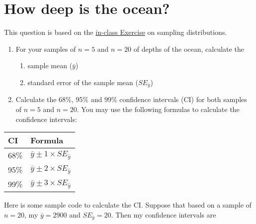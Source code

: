 \documentclass[letterpaper,9pt,twoside,printwatermark=false]{pinp}
\providecommand{\tightlist}{%
  \setlength{\itemsep}{0pt}\setlength{\parskip}{0pt}}
\begin{document}
\section{How deep is the ocean?}\label{how-deep-is-the-ocean}

This question is based on the
\href{https://github.com/sahirbhatnagar/EPIB607/blob/master/exercises/water/students/260194225_water_exercise_epib607.pdf}{in-class
Exercise} on sampling distributions.

\begin{enumerate}
\def\labelenumi{\alph{enumi}.}
\tightlist
\item
  For your samples of \(n=5\) and \(n=20\) of depths of the ocean,
  calculate the

  \begin{enumerate}
  \def\labelenumii{\roman{enumii}.}
  \tightlist
  \item
    sample mean (\(\bar{y}\))
  \item
    standard error of the sample mean (\(SE_{\bar{y}}\))
  \end{enumerate}
\item
  Calculate the 68\%, 95\% and 99\% confidence intervals (CI) for both
  samples of \(n=5\) and \(n=20\). You may use the following formulas to
  calculate the confidence intervals:
\end{enumerate}

\begin{longtable}[]{@{}ll@{}}
\toprule
CI & Formula\tabularnewline
\midrule
\endhead
68\% & \(\bar{y} \pm 1 \times SE_{\bar{y}}\)\tabularnewline
95\% & \(\bar{y} \pm 2 \times SE_{\bar{y}}\)\tabularnewline
99\% & \(\bar{y} \pm 3 \times SE_{\bar{y}}\)\tabularnewline
\bottomrule
\end{longtable}

Here is some sample code to calculate the CI. Suppose that based on a
sample of \(n=20\), my \(\bar{y} = 2900\) and \(SE_{\bar{y}} = 20\).
Then my confidence intervals are

\begin{Shaded}
\end{Shaded}
\end{document}
